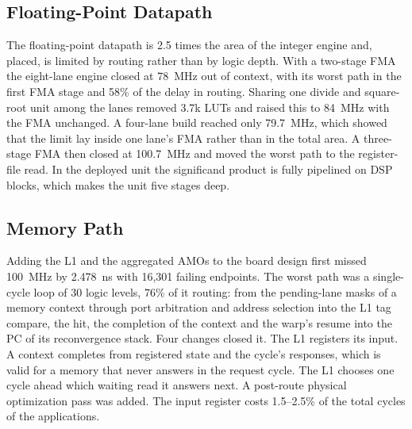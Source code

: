 \documentclass[journal]{IEEEtran}
\begin{document}
\subsection{Floating-Point Datapath}
The floating-point datapath is 2.5 times the area of the integer engine and,
placed, is limited by routing rather than by logic depth. With a two-stage FMA the
eight-lane engine closed at 78~MHz out of context, with its worst path in the
first FMA stage and 58\% of the delay in routing. Sharing one divide and
square-root unit among the lanes removed 3.7k LUTs and raised this to 84~MHz with
the FMA unchanged. A four-lane build reached only 79.7~MHz, which showed that the
limit lay inside one lane's FMA rather than in the total area. A three-stage FMA
then closed at 100.7~MHz and moved the worst path to the register-file read. In
the deployed unit the significand product is fully pipelined on DSP blocks, which
makes the unit five stages deep.

\subsection{Memory Path}\label{sec:closure}
Adding the L1 and the aggregated AMOs to the board design first missed 100~MHz by
2.478~ns with 16,301 failing endpoints. The worst path was a single-cycle loop of
30 logic levels, 76\% of it routing: from the pending-lane masks of a memory
context through port arbitration and address selection into the L1 tag compare,
the hit, the completion of the context and the warp's resume into the PC of its
reconvergence stack. Four changes closed it. The L1 registers its input. A
context completes from registered state and the cycle's responses, which is valid
for a memory that never answers in the request cycle. The L1 chooses one cycle
ahead which waiting read it answers next. A post-route physical optimization pass
was added. The input register costs 1.5--2.5\% of the total cycles of the
applications.
\end{document}
